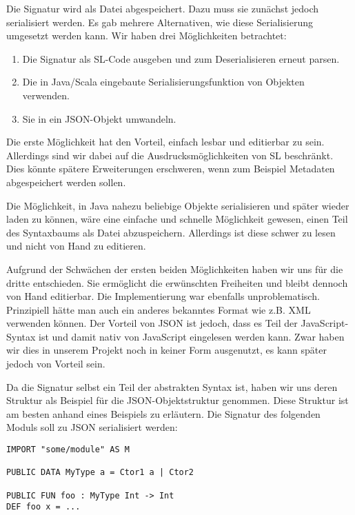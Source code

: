 \documentclass[runningheads]{llncs}
\begin{document}
Die Signatur wird als Datei abgespeichert. Dazu muss sie zunächst jedoch serialisiert werden. Es gab mehrere Alternativen, wie diese Serialisierung umgesetzt werden kann. Wir haben drei Möglichkeiten betrachtet:

\begin{enumerate}
 \item Die Signatur als SL-Code ausgeben und zum Deserialisieren erneut parsen.
 \item Die in Java/Scala eingebaute Serialisierungsfunktion von Objekten verwenden.
 \item Sie in ein JSON-Objekt umwandeln.
\end{enumerate}

Die erste Möglichkeit hat den Vorteil, einfach lesbar und editierbar zu sein. Allerdings sind wir dabei auf die Ausdrucksmöglichkeiten von SL beschränkt. Dies könnte spätere Erweiterungen erschweren, wenn zum Beispiel Metadaten abgespeichert werden sollen.

Die Möglichkeit, in Java nahezu beliebige Objekte serialisieren und später wieder laden zu können, wäre eine einfache und schnelle Möglichkeit gewesen, einen Teil des Syntaxbaums als Datei abzuspeichern. Allerdings ist diese schwer zu lesen und nicht von Hand zu editieren.

Aufgrund der Schwächen der ersten beiden Möglichkeiten haben wir uns für die dritte entschieden. Sie ermöglicht die erwünschten Freiheiten und bleibt dennoch von Hand editierbar. Die Implementierung war ebenfalls unproblematisch. Prinzipiell hätte man auch ein anderes bekanntes Format wie z.B. XML verwenden können. Der Vorteil von JSON ist jedoch, dass es Teil der JavaScript-Syntax ist und damit nativ von JavaScript eingelesen werden kann. Zwar haben wir dies in unserem Projekt noch in keiner Form ausgenutzt, es kann später jedoch von Vorteil sein.

Da die Signatur selbst ein Teil der abstrakten Syntax ist, haben wir uns deren Struktur als Beispiel für die JSON-Objektstruktur genommen. Diese Struktur ist am besten anhand eines Beispiels zu erläutern. Die Signatur des folgenden Moduls soll zu JSON serialisiert werden:

\begin{verbatim}
IMPORT "some/module" AS M

PUBLIC DATA MyType a = Ctor1 a | Ctor2

PUBLIC FUN foo : MyType Int -> Int
DEF foo x = ...
\end{verbatim}
\end{document}

